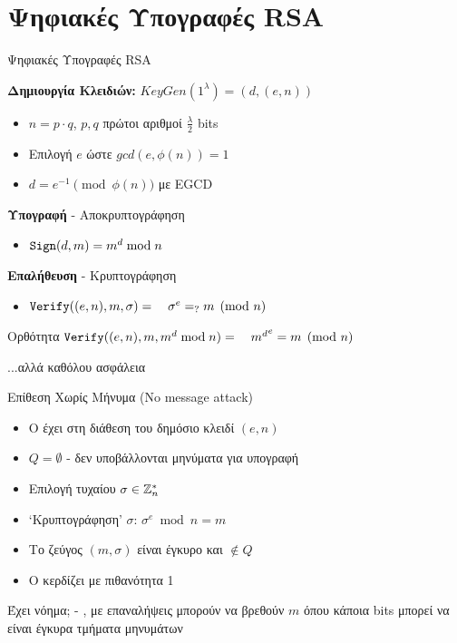 \documentclass{beamer}
\begin{document}
\section{Ψηφιακές Υπογραφές RSA}
\begin{frame} {Ψηφιακές Υπογραφές RSA}
 
\textbf{Δημιουργία Κλειδιών:}
$KeyGen(1^{\lambda}) = (d,(e,n))$
\begin{itemize}
\item $n=p \cdot q$, $p,q$ πρώτοι αριθμοί $\frac{\lambda}{2}$ bits
\item Επιλογή $e$ ώστε $gcd(e,\phi(n))=1$
\item $d = e^{-1} \pmod{\phi(n)}$ με EGCD
\end{itemize}
\pause
\textbf{Υπογραφή} - Αποκρυπτογράφηση
\begin{itemize}
\item $\mathtt{Sign}(d, m) = m^d \bmod n$
\end{itemize}
\pause
\textbf{Επαλήθευση} - Κρυπτογράφηση
\begin{itemize}
\item $\verify((e,n), m, \sigma) = \ \ \ \sigma^e =_? m \pmod{n}$
\end{itemize} 
\pause
\begin{block}{Ορθότητα}
$\mathtt{Verify}((e,n), m, m^d \bmod{n})= \ \ \  {m^d}^e = m \pmod{n}$
\end{block}
\pause
\alert{...αλλά καθόλου ασφάλεια}
\end{frame}

\begin{frame}{Επίθεση Χωρίς Μήνυμα (No message attack)}
\begin{itemize}
\item O \adv έχει στη διάθεση του δημόσιο κλειδί $(e,n)$
\pause
\item $Q = \emptyset$ - δεν υποβάλλονται μηνύματα για υπογραφή
\pause
\item Επιλογή τυχαίου $\sigma \in \mathbb{Z}^*_n$
\pause
\item `Kρυπτογράφηση' $\sigma$: $\sigma^e \bmod n = m$
\pause
\item Το ζεύγος $(m,\sigma)$ είναι έγκυρο και $\not \in Q$
\pause
\item O \adv κερδίζει με πιθανότητα 1
\end{itemize}

\alert{Έχει νόημα;} - , με επαναλήψεις μπορούν να βρεθούν $m$ όπου κάποια bits μπορεί να είναι έγκυρα τμήματα μηνυμάτων
\end{frame}
\end{document}
